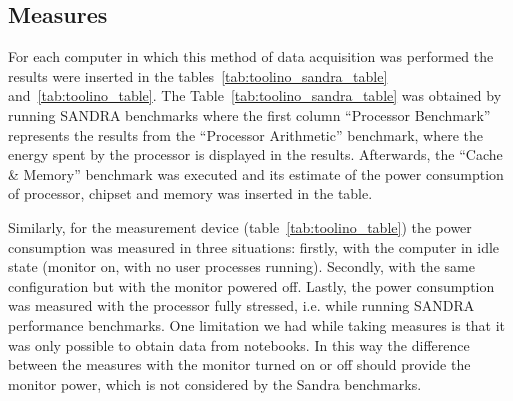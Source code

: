     \subsection{Measures}\label{sec3:measures}
        For each computer in which this method of data acquisition was performed the results were inserted in the tables~\ref{tab:toolino_sandra_table} and~\ref{tab:toolino_table}. The Table~\ref{tab:toolino_sandra_table} was obtained by running SANDRA benchmarks where the first column ``Processor Benchmark'' represents the results from the ``Processor Arithmetic'' benchmark, where the energy spent by the processor is displayed in the results. Afterwards, the ``Cache \& Memory'' benchmark was executed and its estimate of the power consumption of processor, chipset and memory was inserted in the table.
        
        Similarly, for the measurement device (table~\ref{tab:toolino_table}) the power consumption was measured in three situations: firstly, with the computer in idle state (monitor on, with no user processes running). Secondly, with the same configuration but with the monitor powered off. Lastly, the power consumption was measured with the processor fully stressed, i.e. while running SANDRA performance benchmarks. One limitation we had while taking measures is that it was only possible to obtain data from notebooks. In this way the difference between the measures with the monitor turned on or off should provide the monitor power, which is not considered by the Sandra benchmarks.
        
